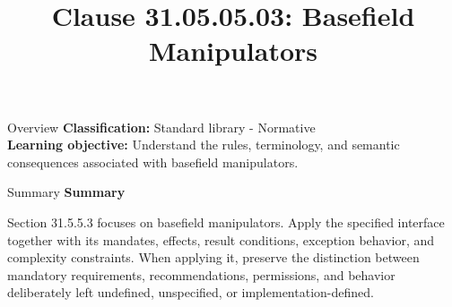 \documentclass[10pt,letterpaper]{article}
\title{Clause 31.05.05.03: Basefield Manipulators}
\author{}
\date{}
\begin{document}
\maketitle
\begin{CornellOverviewBox}{Overview}
\textbf{Classification:} Standard library - Normative\\[2pt]
\textbf{Learning objective:} Understand the rules, terminology, and semantic consequences associated with basefield manipulators.
\end{CornellOverviewBox}\begin{CornellSummaryBox}{Summary}
{\sffamily\bfseries\color{Accent} Summary}\par\vspace{3pt}Section 31.5.5.3 focuses on basefield manipulators. Apply the specified interface together with its mandates, effects, result conditions, exception behavior, and complexity constraints. When applying it, preserve the distinction between mandatory requirements, recommendations, permissions, and behavior deliberately left undefined, unspecified, or implementation-defined.
\end{CornellSummaryBox}
\end{document}
